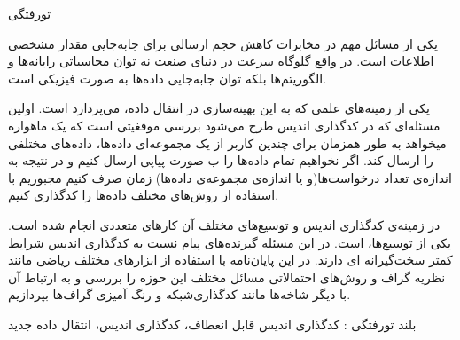 


\begin{وسط‌چین}
\end{وسط‌چین}
‌تورفتگی

یکی از مسائل مهم در مخابرات کاهش حجم ارسالی برای جابه‌جایی مقدار مشخصی اطلاعات است. در واقع گلوگاه سرعت در دنیای صنعت نه توان محاسباتی رایانه‌ها و الگوریتم‌ها بلکه توان جابه‌جایی داده‌ها به صورت فیزیکی است.

یکی از زمینه‌های علمی که به این بهینه‌سازی در انتقال داده، می‌پردازد 
است. اولین مسئله‌ای که در کدگذاری اندیس طرح می‌شود بررسی موقغیتی است که یک ماهواره میخواهد به طور همزمان برای چندین کاربر از یک مجموعه‌ای داده‌ها، داده‌های مختلفی را ارسال کند. اگر نخواهیم تمام داده‌ها را ب صورت پیاپی ارسال کنیم و در نتیجه به اندازه‌ی تعداد درخواست‌ها(و یا اندازه‌ی مجموعه‌ی داده‌ها) زمان صرف کنیم مجبوریم با استفاده از روش‌های مختلف داده‌ها را کدگذاری کنیم.

در زمینه‌ی کدگذاری اندیس و توسیع‌های مختلف آن کارهای متعددی انجام شده است. یکی از توسیع‌ها،
است. در این مسئله گیرنده‌های پیام نسبت به کدگذاری اندیس شرایط کمتر سخت‌گیرانه ای دارند. در این پایان‌‌نامه با استفاده از ابزارهای مختلف ریاضی مانند نظریه گراف و روش‌های احتمالاتی مسائل مختلف این حوزه را بررسی و به ارتباط آن با دیگر شاخه‌ها مانند کدگذار‌ی‌شبکه و رنگ آمیزی گراف‌ها بپردازیم.

‌بلند
‌تورفتگی :
کدگذاری اندیس قابل انعطاف، کدگذاری اندیس، انتقال داده
‌جدید
